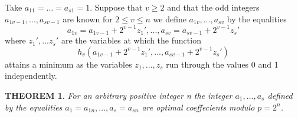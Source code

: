 \documentclass[a4paper, 12pt]{article}
\newtheorem{mydef}{THEOREM}
\begin{document}
Take $a_{11}=...=a_{s1}=1$. Suppose that $v\ge2$ and that the odd integers $a_{1v-1},...,a_{sv-1}$ are known for $2\le v \le n$ we define $a_{1v},...,a_{sv}$ by the equalities
\begin{equation*}
a_{1v}=a_{1v-1}+2^{v-1}z_1',...,a_{sv}=a_{sv-1}+2^{v-1}z_s'
\end{equation*} 
where $z_1',...z_s'$ are the variables at which the function
\begin{equation*}
h_v(a_{1v-1}+2^{v-1}z_1',...,a_{sv-1}+2^{v-1}z_s')
\end{equation*}
attains a minimum as the variables $z_1,...,z_s$ run through the values 0 and 1 independently.
\begin{mydef}
For an arbitrary positive integer n the integer $a_1,...,a_s$ defined by the equalities $a_1=a_{1n},...,a_s=a_{sn}$ are optimal coeffecients modulo $p=2^n$.
\end{mydef}
\end{document}
